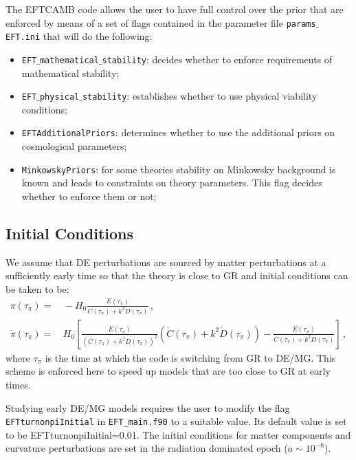 \documentclass[prd,nofootinbib,showpacs]{revtex4}
\def\l{\left}
\def\r{\right}
\def\f{\frac}
\begin{document}
{The EFTCAMB code allows the user to have full control over the prior that are enforced by means of a set of flags contained in the parameter file \texttt{params$\_$EFT.ini} that will do the following:
%
\begin{itemize}
\item \texttt{EFT$\_$mathematical$\_$stability}: decides whether to enforce requirements of mathematical stability;
\item \texttt{EFT$\_$physical$\_$stability}: establishes whether to use physical viability conditions;
\item \texttt{EFTAdditionalPriors}: determines whether to use the additional priors on cosmological parameters;
\item \texttt{MinkowskyPriors}: for some theories stability on Minkowsky background is known and leads to constraints on theory parameters. This flag decides whether to enforce them or not;
\end{itemize}
%

\subsection{Initial Conditions}\label{SubSec:InitialConditions}
%
We assume that DE perturbations are sourced by matter perturbations at a sufficiently early time so that the theory is close to GR and initial conditions can be taken to be:
%
\begin{align}
\pi \l(\tau_\pi\r) =&\, -H_0 \f{E(\tau_\pi)}{C(\tau_\pi) +k^2 D(\tau_\pi)} \,,\nonumber \\
\dot{\pi} \l( \tau_\pi \r) =&\, H_0\l[\frac{E(\tau_\pi)}{(C(\tau_\pi)+k^2D(\tau_\pi))^2}(\dot{C}(\tau_\pi)+k^2\dot{D}(\tau_\pi))-\frac{\dot{E}(\tau_\pi)}{C(\tau_\pi)+k^2D(\tau_\pi)}\right] \,,
\end{align}
%
where $\tau_\pi$ is the time at which the code is switching from GR to DE/MG. This scheme is enforced here to speed up models that are too close to GR at early times. 


Studying early DE/MG models requires the user to modify the flag \verb|EFTturnonpiInitial| in \verb|EFT_main.f90| to a suitable value. Its default value is set to be  EFTturnonpiInitial=0.01. The  initial conditions for matter components and curvature perturbations are set in the radiation dominated epoch ($a \sim 10^{-8}$). 

}
\end{document}
